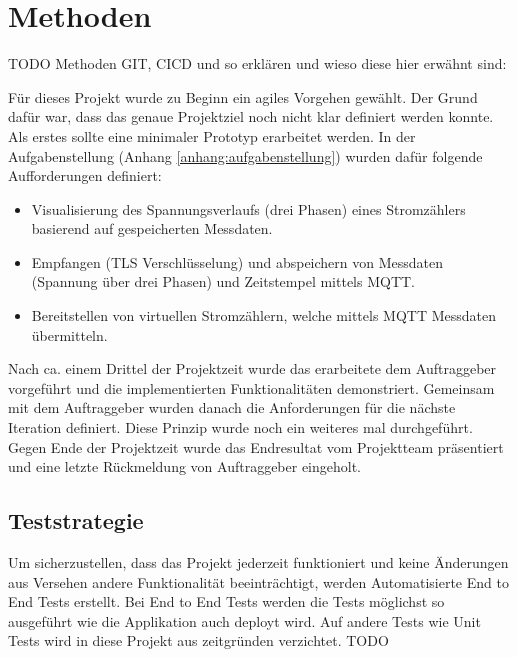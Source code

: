 \chapter{Methoden}
\label{methoden}
TODO Methoden GIT, CICD und so erklären und wieso diese hier erwähnt sind:

Für dieses Projekt wurde zu Beginn ein agiles Vorgehen gewählt.
Der Grund dafür war, dass das genaue Projektziel noch nicht klar definiert werden konnte.
Als erstes sollte eine minimaler Prototyp erarbeitet werden. In der Aufgabenstellung (Anhang \ref{anhang:aufgabenstellung}) wurden dafür folgende Aufforderungen definiert:
\begin{itemize}
\item Visualisierung des Spannungsverlaufs (drei Phasen) eines Stromzählers
basierend auf gespeicherten Messdaten.
\item Empfangen (TLS Verschlüsselung) und abspeichern von Messdaten (Spannung über drei Phasen) und
Zeitstempel mittels MQTT.
\item Bereitstellen von virtuellen Stromzählern, welche mittels MQTT Messdaten
übermitteln.
\end{itemize}
Nach ca. einem Drittel der Projektzeit wurde das erarbeitete dem Auftraggeber vorgeführt und die implementierten Funktionalitäten demonstriert.
Gemeinsam mit dem Auftraggeber wurden danach die Anforderungen für die nächste Iteration definiert.
Diese Prinzip wurde noch ein weiteres mal durchgeführt.
Gegen Ende der Projektzeit wurde das Endresultat vom Projektteam präsentiert und eine letzte Rückmeldung von Auftraggeber eingeholt.




\section{Teststrategie}
\label{teststrategie}

Um sicherzustellen, dass das Projekt jederzeit funktioniert und keine Änderungen
aus Versehen andere Funktionalität beeinträchtigt, werden Automatisierte
End to End Tests erstellt. Bei End to End Tests werden die Tests möglichst
so ausgeführt wie die Applikation auch deployt wird. \parencite{georgian_2021}
Auf andere Tests wie Unit Tests wird in diese Projekt aus zeitgründen verzichtet. TODO


